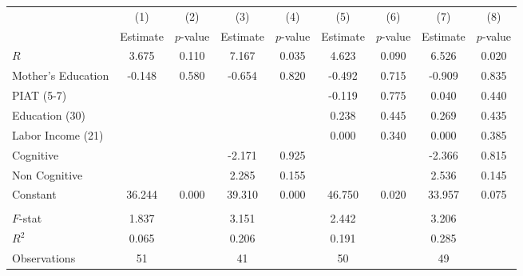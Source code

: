 \begin{tabular}{lcccccccc} \toprule
 & (1) & (2) & (3) & (4) & (5) & (6) & (7) & (8) \\ 
 & Estimate  & $p$-value  & Estimate  & $p$-value  & Estimate  & $p$-value  & Estimate  & $p$-value  \\  \midrule
$R$ &     3.675 &     0.110 &     7.167 &     0.035 &     4.623 &     0.090 &     6.526 &     0.020 \\  
Mother's Education &    -0.148 &     0.580 &    -0.654 &     0.820 &    -0.492 &     0.715 &    -0.909 &     0.835 \\  
PIAT (5-7) &         &         &         &         &    -0.119 &     0.775 &     0.040 &     0.440 \\  
Education (30) &         &         &         &         &     0.238 &     0.445 &     0.269 &     0.435 \\  
Labor Income (21) &         &         &         &         &     0.000 &     0.340 &     0.000 &     0.385 \\  
Cognitive &         &         &    -2.171 &     0.925 &         &         &    -2.366 &     0.815 \\  
Non Cognitive &         &         &     2.285 &     0.155 &         &         &     2.536 &     0.145 \\  
Constant &    36.244 &     0.000 &    39.310 &     0.000 &    46.750 &     0.020 &    33.957 &     0.075 \\  \\ \midrule
$F$-stat &     1.837 &         &     3.151 &         &     2.442 &         &     3.206 &         \\  
$R^2$ &     0.065 &         &     0.206 &         &     0.191 &         &     0.285 &         \\  
Observations &    51 &         &    41 &         &    50 &         &    49 &         \\  
\bottomrule \end{tabular}
